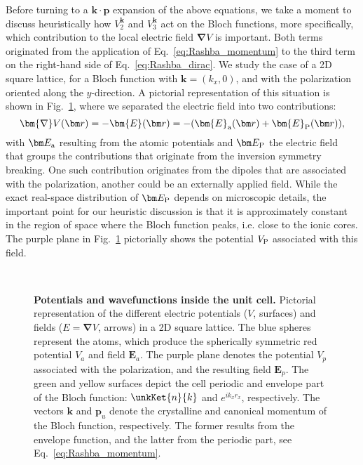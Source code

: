Before turning to a $\bm{k} \cdot \bm{p}$ expansion of the above equations, we take a moment to discuss heuristically how $V^{\bm k}_2$ and $V^{\bm k}_3$ act on the Bloch functions, more specifically, which contribution to the local electric field $\bm{\nabla}V$ is important.
Both terms originated from the application of Eq.~\eqref{eq:Rashba_momentum} to the third term on the right-hand side of Eq.~\eqref{eq:Rashba_dirac}.
We study the case of a 2D square lattice, for a Bloch function with $\bm k = (k_x, 0)$, and with the polarization oriented along the $y$-direction.
A pictorial representation of this situation is shown in Fig.~\ref{fig:Efield_cell_drawing}, where we separated the electric field into two contributions:
\begin{equation}
	\bm{\nabla} V(\bm r) = - \bm{E}(\bm r) = - (\bm{E}_{\rm a}(\bm r) + \bm{E}_{\rm P}(\bm r)),
\end{equation}
with $\bm E_{\rm a}$ resulting from the atomic potentials and $\bm E_{\rm P}$ the electric field that groups the contributions that originate from the inversion symmetry breaking. One such contribution originates from the dipoles that are associated with the polarization, another could be an externally applied field.
While the exact real-space distribution of $\bm E_{\rm P}$ depends on microscopic details, the important point for our heuristic discussion is that it is approximately constant in the region of space where the Bloch function peaks, i.e. close to the ionic cores.
The purple plane in Fig.~\ref{fig:Efield_cell_drawing} pictorially shows the potential $V_{\rm P}$ associated with this field.   
\begin{figure}[h]
~\centering
{}\caption{\label{fig:Efield_cell_drawing}{\bf Potentials and wavefunctions inside the unit cell.} Pictorial representation of the different electric potentials ($V$, surfaces) and fields ($E=\bm \nabla V$, arrows) in a 2D square lattice. The blue spheres represent the atoms, which produce the spherically symmetric red potential $V_a$ and field $\bm E_a$. The purple plane denotes the potential $V_p$ associated with the polarization, and the resulting field $\bm E_p$. The green and yellow surfaces depict the cell periodic and envelope part of the Bloch function: $\unkKet{n}{k}$ and $e^{ik_x r_x}$, respectively. The vectors $\bm k$ and $\bm p_u$ denote the crystalline and canonical momentum of the Bloch function, respectively.
The former results from the envelope function, and the latter from the periodic part, see Eq.~\eqref{eq:Rashba_momentum}.}
\end{figure}
    
